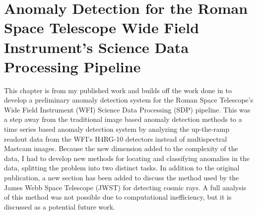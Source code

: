 \chapter[Anomaly Detection for the Roman Space Telescope Wide Field Instrument's Science Data Processing Pipeline]{Anomaly Detection for the Roman Space Telescope Wide Field Instrument's Science Data Processing Pipeline}
\label{ch:rst}
This chapter is from my published work \cite{horton2024anomaly} and builds off the work done in \cite{horton2020novelty} to develop a preliminary anomaly detection system for the Roman Space Telescope's Wide Field Instrument (WFI) Science Data Processing (SDP) pipeline.
This was a step away from the traditional image based anomaly detection methods to a time series based anomaly detection system by analyzing the up-the-ramp readout data from the WFI's H4RG-10 detectors instead of multispectral Mastcam images.
Because the new dimension added to the complexity of the data, I had to develop new methods for locating and classifying anomalies in the data, splitting the problem into two distinct tasks.
In addition to the original publication, a new section has been added to discuss the method used by the James Webb Space Telescope (JWST) for detecting cosmic rays. 
A full analysis of this method was not possible due to computational inefficiency, but it is discussed as a potential future work.

